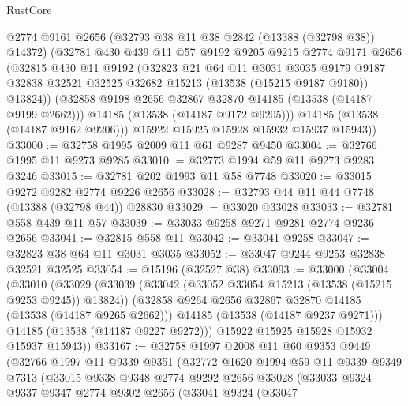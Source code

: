 \begin{lexlean}{RustCore}
\begin{coremodule}
          @2774
          @9161
          @2656
          (@32793 @38 @11 @38 @2842 (@13388 (@32798 @38)) @14372)
          (@32781
            @430
            @439
            @11
            @57
            @9192
            @9205
            @9215
            @2774
            @9171
            @2656
            (@32815
              @430
              @11
              @9192
              (@32823
                @21
                @64
                @11
                @3031
                @3035
                @9179
                @9187
                @32838
                @32521
                @32525
                @32682
                @15213
                (@13538 (@15215 @9187 @9180))
                @13824))
            (@32858 @9198 @2656 @32867 @32870 @14185 (@13538 (@14187 @9199 @2662)))
            @14185
            (@13538 (@14187 @9172 @9205)))
          @14185
          (@13538 (@14187 @9162 @9206)))
        @15922
        @15925
        @15928
        @15932
        @15937
        @15943))
@33000 := @32758 @1995 @2009 @11 @61 @9287 @9450
@33004 := @32766 @1995 @11 @9273 @9285
@33010 := @32773 @1994 @59 @11 @9273 @9283 @3246
@33015 := @32781 @202 @1993 @11 @58 @7748
@33020 := @33015 @9272 @9282 @2774 @9226 @2656
@33028 := @32793 @44 @11 @44 @7748 (@13388 (@32798 @44)) @28830
@33029 := @33020 @33028
@33033 := @32781 @558 @439 @11 @57
@33039 := @33033 @9258 @9271 @9281 @2774 @9236 @2656
@33041 := @32815 @558 @11
@33042 := @33041 @9258
@33047 := @32823 @38 @64 @11 @3031 @3035
@33052 := @33047 @9244 @9253 @32838 @32521 @32525
@33054 := @15196 (@32527 @38)
@33093 := @33000
    (@33004
      (@33010
        (@33029
          (@33039
            (@33042 (@33052 @33054 @15213 (@13538 (@15215 @9253 @9245)) @13824))
            (@32858 @9264 @2656 @32867 @32870 @14185 (@13538 (@14187 @9265 @2662)))
            @14185
            (@13538 (@14187 @9237 @9271)))
          @14185
          (@13538 (@14187 @9227 @9272)))
        @15922
        @15925
        @15928
        @15932
        @15937
        @15943))
@33167 := @32758
    @1997
    @2008
    @11
    @60
    @9353
    @9449
    (@32766
      @1997
      @11
      @9339
      @9351
      (@32772
        @1620
        @1994
        @59
        @11
        @9339
        @9349
        @7313
        (@33015
          @9338
          @9348
          @2774
          @9292
          @2656
          @33028
          (@33033
            @9324
            @9337
            @9347
            @2774
            @9302
            @2656
            (@33041
              @9324
              (@33047

\end{coremodule}
\end{lexlean}
